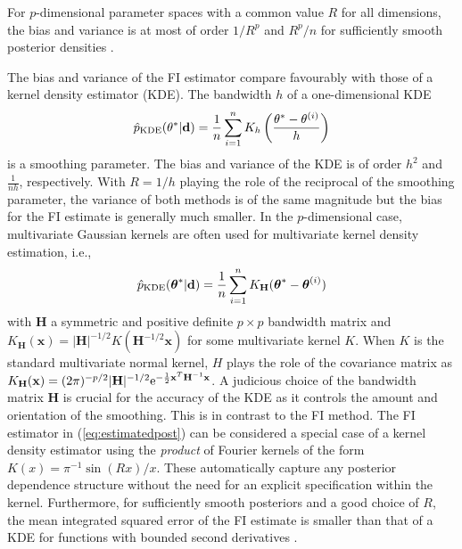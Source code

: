 \documentclass[%
 reprint,
 amsmath,amssymb,
 aps,
]{revtex4-2}
\def\xbold{\mathbf{x}}
\def\H{\mathbf{H}}
\renewcommand{\d}{{\bf d}}
\newcommand{\btheta}{\mbox{\boldmath $\theta$}}
\newcommand{\e}{{\rm e}}
\begin{document}
For $p$-dimensional parameter spaces with a common value $R$ for all dimensions, the bias and variance is at most of order $1/R^p$ and  $R^p/n$ for sufficiently smooth posterior densities \cite{ho2020multivariate}.
  

The bias and variance of the FI estimator compare favourably with those of a kernel density estimator (KDE). The bandwidth $h$ of a one-dimensional KDE
\[ \hat{p}_\text{KDE}(\theta^*|\d)= \frac{1}{n} \sum_{i=1}^n K_h\left(\frac{\theta^*-\theta^{(i)}}{h}\right)\]
is a smoothing parameter. The bias and variance of the KDE is of order $h^2$ and $\frac{1}{nh}$, respectively. 
With $R=1/h$ playing the role of the reciprocal of the smoothing parameter, the variance of both methods is of the same magnitude but the bias for the FI estimate is generally much smaller.
In the $p$-dimensional case, multivariate Gaussian kernels are often used for multivariate kernel density estimation, i.e.,
\[ \hat{p}_\text{KDE}(\btheta^*|\d)= \frac{1}{n} \sum_{i=1}^n K_\H(\btheta^*-\btheta^{(i)})\]
with $\H$ a symmetric and positive definite $p\times p$ bandwidth matrix and $K_\H(\xbold)=|\H|^{-1/2} K(\H^{-1/2}\xbold)$ for some multivariate kernel $K$. When  $K$ is the standard multivariate normal kernel, $H$ plays the role of the covariance matrix as $K_\H(\xbold)=(2\pi)^{-p/2}|\H|^{-1/2} \e^{-\frac{1}{2}\xbold^T \H^{-1}\xbold}$. A judicious choice of the bandwidth matrix $\H$ is crucial for the accuracy of the KDE as it controls the amount and orientation of the smoothing.
 This is in contrast to the FI method. The FI estimator in (\ref{eq:estimatedpost}) can be considered  a special case of a kernel density estimator using the {\em product} of Fourier kernels of the form $K(x)=\pi^{-1}\sin(R x)/x$.  These  automatically capture any posterior dependence structure without the need for an explicit specification within the kernel. 
 Furthermore, for sufficiently smooth posteriors and a good choice of $R$, the mean integrated squared error of the FI estimate is smaller than that of a KDE for functions with bounded second derivatives \cite{ho2020multivariate}.
\end{document}
